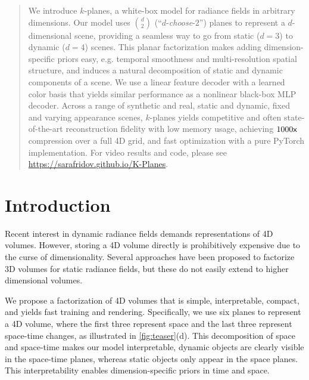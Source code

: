 \documentclass[10pt,twocolumn,letterpaper]{article}
\newcommand*{\x}{\mathsf{x}\mskip1mu}
\begin{document}
\begin{abstract}
We introduce $k$-planes, a white-box model for radiance fields in arbitrary dimensions. Our model uses $\binom{d}{2}$ (``$d$-\textit{choose}-$2$'') planes to represent a $d$-dimensional scene, providing a seamless way to go from static ($d=3$) to dynamic ($d=4$) scenes. This planar factorization makes adding dimension-specific priors easy, e.g. temporal smoothness and multi-resolution spatial structure, and induces a natural decomposition of static and dynamic components of a scene. We use a linear feature decoder with a learned color basis that yields similar performance as a nonlinear black-box MLP decoder. Across a range of synthetic and real, static and dynamic, fixed and varying appearance scenes, $k$-planes yields competitive and often state-of-the-art reconstruction fidelity with low memory usage, achieving $1000\x$ compression over a full 4D grid, and fast optimization with a pure PyTorch implementation. For video results and code, please see \url{https://sarafridov.github.io/K-Planes}.

\vspace{-1pt}

\end{abstract}


\vspace{-10pt}

\section{Introduction}\label{sec:intro}

Recent interest in dynamic radiance fields demands representations of 4D volumes. However, storing a 4D volume directly is prohibitively expensive due to the curse of dimensionality. Several approaches have been proposed to factorize 3D volumes for static radiance fields, but these do not easily extend to higher dimensional volumes.

We propose a factorization of 4D volumes that is simple, interpretable, compact, and yields fast training and rendering. Specifically, we use six planes to represent a 4D volume, where the first three represent space and the last three represent space-time changes, as illustrated in \cref{fig:teaser}(d). This decomposition of space and space-time makes our model interpretable, \ie dynamic objects are clearly visible in the space-time planes, whereas static objects only appear in the space planes. 
This interpretability enables dimension-specific priors in time and space.
\end{document}
